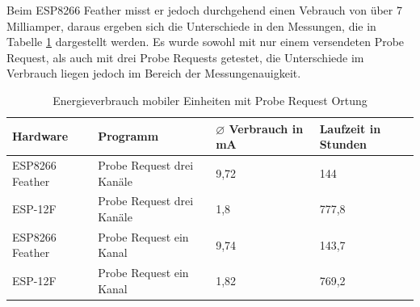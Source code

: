 Beim ESP8266 Feather misst er jedoch durchgehend einen Vebrauch von über 7 Milliamper, daraus ergeben sich die Unterschiede in den Messungen, die in Tabelle \ref{table:probereqina} dargestellt werden.
Es wurde sowohl mit nur einem versendeten Probe Request, als auch mit drei Probe Requests getestet, die Unterschiede im Verbrauch liegen jedoch im Bereich der Messungenauigkeit.

\begin{table}[h!]
	\centering
	\caption{Energieverbrauch mobiler Einheiten mit Probe Request Ortung}
	\label{table:probereqina}
	\begin{tabular}{p{3.5cm}|p{5cm}|p{2.5cm}|p{2.5cm}}
		Hardware & Programm & $\varnothing$ Verbrauch in mA & Laufzeit in Stunden\\
		\hline
		ESP8266 Feather & Probe Request drei Kanäle & 9,72 & 144\\
		ESP-12F & Probe Request drei Kanäle & 1,8 & 777,8\\
		ESP8266 Feather & Probe Request ein Kanal & 9,74 & 143,7\\
		ESP-12F & Probe Request ein Kanal & 1,82 & 769,2\\
	\end{tabular}
\end{table}
